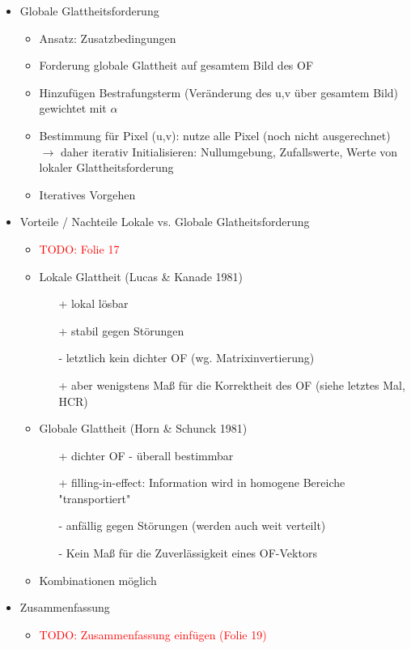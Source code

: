 \documentclass{report}
\newcommand{\todo}[2][red]{\textcolor{#1}{TODO: #2}}
\begin{document}
\begin{itemize}
		
		\item Globale Glattheitsforderung
		\begin{itemize}
			\item Ansatz: Zusatzbedingungen
			\item Forderung globale Glattheit auf gesamtem Bild des OF
			\item Hinzufügen Bestrafungsterm (Veränderung des u,v über gesamtem Bild) gewichtet mit $\alpha$
			\item Bestimmung für Pixel (u,v): nutze alle Pixel (noch nicht ausgerechnet) $\rightarrow$ daher iterativ
			\newline Initialisieren: Nullumgebung, Zufallswerte, Werte von lokaler Glattheitsforderung
			\item Iteratives Vorgehen
		\end{itemize}
		
		\item Vorteile / Nachteile Lokale vs. Globale Glatheitsforderung
		\begin{itemize}
			\item \todo{Folie 17}
			\item Lokale Glattheit (Lucas \& Kanade 1981)
			\begin{itemize}
				\item[+] lokal lösbar
				\item[+] stabil gegen Störungen
				\item[-] letztlich kein dichter OF (wg. Matrixinvertierung) 
				\item[+] aber wenigstens Maß für die Korrektheit des OF (siehe letztes Mal, HCR)
			\end{itemize}
			
			\item Globale Glattheit (Horn \& Schunck 1981)
			\begin{itemize}
				\item[+] dichter OF - überall bestimmbar
				\item[+] filling-in-effect: Information wird in homogene Bereiche "transportiert"
				\item[-] anfällig gegen Störungen (werden auch weit verteilt)
				\item[-] Kein Maß für die Zuverlässigkeit eines OF-Vektors
			\end{itemize}
		
			\item Kombinationen möglich
			
		\end{itemize}
		
		\item Zusammenfassung
		\begin{itemize}
			\item \todo{Zusammenfassung einfügen (Folie 19)}
		\end{itemize}
	\end{itemize}
	\newpage
	
\end{document}
